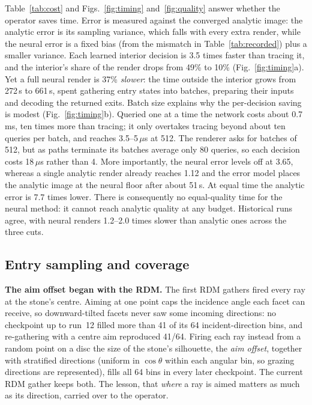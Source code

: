 \documentclass[conference]{IEEEtran}
\begin{document}
Table~\ref{tab:cost} and Figs.~\ref{fig:timing} and~\ref{fig:quality} answer
whether the operator saves time. Error is measured against the converged analytic image: the
analytic error is its sampling variance, which falls with every extra render,
while the neural error is a fixed bias (from the mismatch in
Table~\ref{tab:recorded}) plus a smaller variance. Each learned interior
decision is 3.5 times faster than tracing it, and the interior's share of the
render drops from 49\% to 10\% (Fig.~\ref{fig:timing}a). Yet a full neural
render is 37\% \emph{slower}: the time outside the interior grows from 272\,s to
661\,s, spent gathering entry states into batches, preparing their inputs and
decoding the returned exits. Batch size explains why the per-decision saving is
modest (Fig.~\ref{fig:timing}b). Queried one at a time the network costs about
0.7\,ms, ten times more than tracing; it only overtakes tracing beyond about ten
queries per batch, and reaches 3.5--5\,$\mu$s at 512. The renderer asks for
batches of 512, but as paths terminate its batches average only 80 queries, so
each decision costs 18\,$\mu$s rather than 4. More importantly, the neural error levels off at 3.65, whereas a single analytic
render already reaches 1.12 and the error model places the analytic image at
the neural floor after about 51\,s. At equal time the analytic error is 7.7 times
lower. There is consequently no equal-quality time for the neural method: it
cannot reach analytic quality at any budget. Historical runs agree, with neural
renders 1.2--2.0 times slower than analytic ones across the three cuts.

\subsection{Entry sampling and coverage}
\label{sec:coverage}
\textbf{The aim offset began with the RDM.} The first RDM gathers fired every
ray at the stone's centre. Aiming at one point caps the incidence angle each
facet can receive, so downward-tilted facets never saw some incoming
directions: no checkpoint up to run~12 filled more than 41 of its 64
incident-direction bins, and re-gathering with a centre aim reproduced 41/64.
Firing each ray instead from a random point on a disc the size of the stone's
silhouette, the \emph{aim offset}, together with stratified directions (uniform
in $\cos\theta$ within each angular bin, so grazing directions are
represented), fills all 64 bins in every later checkpoint. The current RDM
gather keeps both. The lesson, that \emph{where} a
ray is aimed matters as much as its direction, carried over to the operator.
\end{document}

